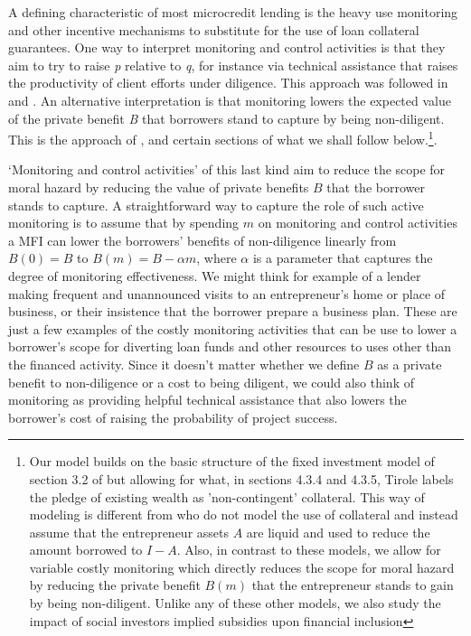 \documentclass[letterpaper, 12pt]{article}
\begin{document}
A defining characteristic of most microcredit lending is the heavy use
monitoring and other incentive mechanisms to substitute for the use of
loan collateral guarantees. One way to interpret monitoring and control
activities is that they aim to try to raise \emph{p} relative to
\emph{q}, for instance via technical assistance that raises the
productivity of client efforts under diligence. This approach was
followed in \citet{banerjee1994} and \citet{madajewicz1997}. An alternative interpretation is that monitoring lowers the expected value of the private benefit \emph{B} that borrowers stand to capture by being non-diligent. This is the approach of \citet{holmstrom1997}, \citet{conning1999} and certain sections of \citet{tirole2006} what we shall follow below.\footnote{Our model builds on the basic structure of the fixed investment model of section 3.2 of \citet{tirole2006} but allowing for what, in sections 4.3.4 and 4.3.5, Tirole labels the pledge of existing wealth as 'non-contingent' collateral. This way of modeling is different from \citet{holmstrom1997} who do not model the use of collateral and instead assume that the entrepreneur assets $A$ are liquid and used to reduce the amount borrowed to $I-A$.  Also, in contrast to these models, we allow for variable costly monitoring which directly reduces the scope for moral hazard by reducing the private benefit $B(m)$ that the entrepreneur stands to gain by being non-diligent. Unlike any of these other models, we also study the impact of social investors implied subsidies upon financial inclusion}. 

`Monitoring and control activities' of this last kind aim to reduce the
scope for moral hazard by reducing the value of private benefits \(B\)
that the borrower stands to capture. A straightforward way to capture
the role of such active monitoring is to assume that by spending \(m\)
on monitoring and control activities a MFI can lower the borrowers'
benefits of non-diligence linearly from
\(B(0) = B\) to \(B(m) = B - \alpha m\), where \(\alpha\) is a parameter
that captures the degree of monitoring effectiveness. We might think for
example of a lender making frequent and unannounced visits to an
entrepreneur's home or place of business, or their insistence that the
borrower prepare a business plan. These are just a few examples of the
costly monitoring activities that can be use to lower a borrower's scope
for diverting loan funds and other resources to uses other than the
financed activity. Since it doesn't matter whether we define \(B\) as a
private benefit to non-diligence or a cost to being diligent, we could
also think of monitoring as providing helpful technical assistance that
also lowers the borrower's cost of raising the probability of project
success.
\end{document}
